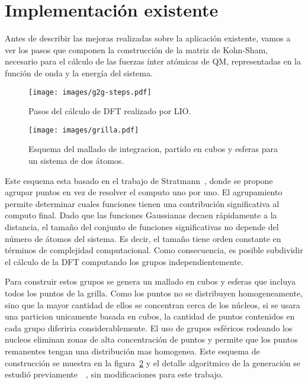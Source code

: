 \section{Implementaci\'on existente}
Antes de describir las mejoras realizadas sobre la aplicaci\'on existente, vamos a ver
los pasos que componen la construcci\'on de la matriz de Kohn-Sham, necesario para el
c\'alculo de las fuerzas \'inter at\'omicas de QM, representadas en la funci\'on de onda y
la energ\'ia del sistema.

\begin{figure}[htbp]
   \centering
   \texttt{[image: images/g2g-steps.pdf]}
   \caption{Pasos del c\'alculo de DFT realizado por LIO.}
   \label{fig:lio-steps}
\end{figure}

\begin{figure}[htbp]
   \centering
   \texttt{[image: images/grilla.pdf]}
   \caption{Esquema del mallado de integracion, partido en cubos y esferas para un sistema de dos \'atomos.}
   \label{fig:grilla}
\end{figure}

Este esquema esta basado en el trabajo de Stratmann~\cite{Stratmann}, donde se propone
agrupar puntos en vez de resolver el computo uno por uno. El agrupamiento permite determinar
cuales funciones tienen una contribuci\'on significativa al computo final. Dado que las
funciones Gaussianas decaen r\'apidamente a la distancia, el tama\~no del conjunto de
funciones significativas no depende del n\'umero de \'atomos del sistema. Es decir, el tama\~no
tiene orden constante en t\'erminos de complejidad computacional. Como consecuencia, es posible
subdividir el c\'alculo de la DFT computando los grupos independientemente.

Para construir estos grupos se genera un mallado en cubos y esferas que incluya todos los puntos
de la grilla. Como los puntos no se distribuyen homogeneamente, sino que la mayor cantidad de ellos
se concentran cerca de los núcleos, si se usara una particion unicamente basada en cubos, la cantidad
de puntos contenidos en cada grupo diferiria considerablemente. El uso de grupos esféricos rodeando
los nucleos eliminan zonas de alta concentraci\'on de puntos y permite que los puntos remanentes
tengan una distribuci\'on mas homogenea. Este esquema de construcci\'on se muestra en la figura~\ref{fig:grilla}
y el detalle algoritmico de la generaci\'on se estudi\'o previamente~\cite{LIO}~\cite{TesisNitsche},
sin modificaciones para este trabajo.


